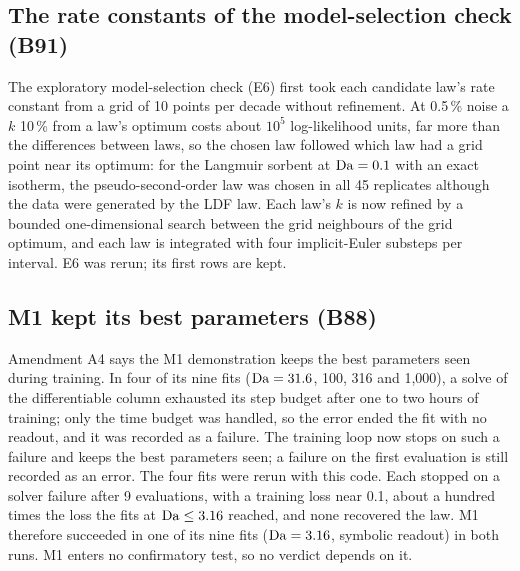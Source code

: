 \subsection*{The rate constants of the model-selection check (B91)}
The exploratory model-selection check (E6) first took each candidate law's rate constant from a
grid of 10 points per decade without refinement. At 0.5\,\% noise a $k$ 10\,\% from a law's
optimum costs about $10^{5}$ log-likelihood units, far more than the differences between laws, so
the chosen law followed which law had a grid point near its optimum: for the Langmuir sorbent at
$\mathrm{Da} = 0.1$ with an exact isotherm, the pseudo-second-order law was chosen in all 45 replicates
although the data were generated by the LDF law. Each law's $k$ is now refined by a bounded
one-dimensional search between the grid neighbours of the grid optimum, and each law is integrated
with four implicit-Euler substeps per interval. E6 was rerun; its first rows are kept.

\subsection*{M1 kept its best parameters (B88)}
Amendment A4 says the M1 demonstration keeps the best parameters seen during training. In four
of its nine fits ($\mathrm{Da} = 31.6$, 100, 316 and 1,000), a solve of the differentiable column
exhausted its step budget after one to two hours of training; only the time budget was handled,
so the error ended the fit with no readout, and it was recorded as a failure. The training loop
now stops on such a failure and keeps the best parameters seen; a failure on the first
evaluation is still recorded as an error. The four fits were rerun with this code.
Each stopped on a solver failure after 9 evaluations, with a training loss near 0.1, about a
hundred times the loss the fits at $\mathrm{Da} \le 3.16$ reached, and none recovered the law. M1
therefore succeeded in one of its nine fits ($\mathrm{Da} = 3.16$, symbolic readout) in both runs. M1
enters no confirmatory test, so no verdict depends on it.

